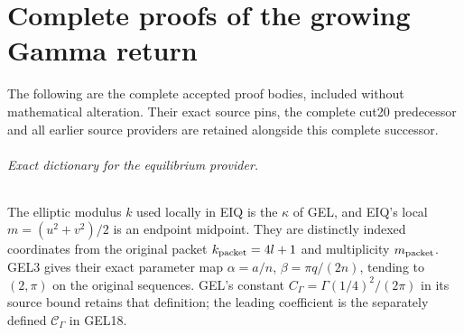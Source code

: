 
\clearpage
\part*{Complete proofs of the growing Gamma return}
The following are the complete accepted proof bodies, included without
mathematical alteration. Their exact source pins, the complete cut20
predecessor and all earlier source providers are retained alongside
this complete successor.


\paragraph{Exact dictionary for the equilibrium provider.}
The elliptic modulus $k$ used locally in EIQ is the $\kappa$ of GEL,
and EIQ's local $m=(u^2+v^2)/2$ is an endpoint midpoint. They are
distinctly indexed coordinates from the original packet
$k_{\rm packet}=4l+1$ and multiplicity $m_{\rm packet}$.
GEL3 gives their exact parameter map
$\alpha=a/n$, $\beta=\pi q/(2n)$, tending to $(2,\pi)$ on
the original sequences. GEL's constant $C_\Gamma=\Gamma(1/4)^2/(2\pi)$
in its source bound retains that definition; the leading coefficient
is the separately defined $\mathcal C_\Gamma$ in GEL18.




